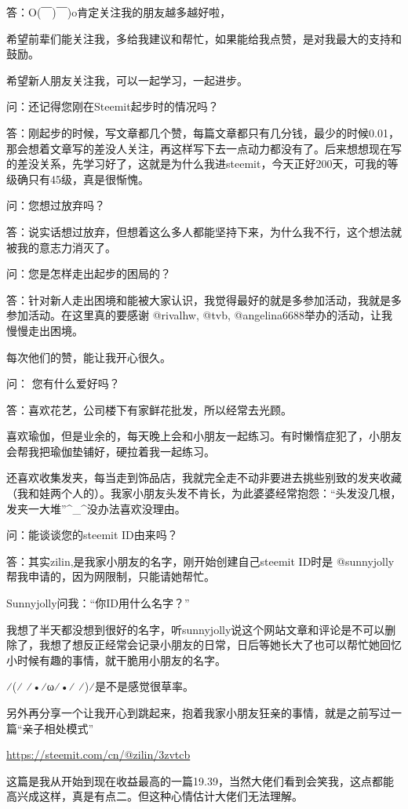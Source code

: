 \documentclass[]{ctexbook}
\begin{document}
答：O(￣)￣)o肯定关注我的朋友越多越好啦，

希望前辈们能关注我，多给我建议和帮忙，如果能给我点赞，是对我最大的支持和鼓励。

希望新人朋友关注我，可以一起学习，一起进步。

问：还记得您刚在Steemit起步时的情况吗？

答：刚起步的时候，写文章都几个赞，每篇文章都只有几分钱，最少的时候0.01，那会想着文章写的差没人关注，再这样写下去一点动力都没有了。后来想想现在写的差没关系，先学习好了，这就是为什么我进steemit，今天正好200天，可我的等级确只有45级，真是很惭愧。

问：您想过放弃吗？

答：说实话想过放弃，但想着这么多人都能坚持下来，为什么我不行，这个想法就被我的意志力消灭了。

问：您是怎样走出起步的困局的？

答：针对新人走出困境和能被大家认识，我觉得最好的就是多参加活动，我就是多参加活动。在这里真的要感谢 @rivalhw, @tvb, @angelina6688举办的活动，让我慢慢走出困境。

每次他们的赞，能让我开心很久。

问： 您有什么爱好吗？

答：喜欢花艺，公司楼下有家鲜花批发，所以经常去光顾。

喜欢瑜伽，但是业余的，每天晚上会和小朋友一起练习。有时懒惰症犯了，小朋友会帮我把瑜伽垫铺好，硬拉着我一起练习。

还喜欢收集发夹，每当走到饰品店，我就完全走不动非要进去挑些别致的发夹收藏（我和娃两个人的）。我家小朋友头发不肯长，为此婆婆经常抱怨：``头发没几根，发夹一大堆''\^{}\_\^{}没办法喜欢没理由。

问：能谈谈您的steemit ID由来吗？

答：其实zilin,是我家小朋友的名字，刚开始创建自己steemit ID时是 @sunnyjolly帮我申请的，因为网限制，只能请她帮忙。

Sunnyjolly问我：``你ID用什么名字？''

我想了半天都没想到很好的名字，听sunnyjolly说这个网站文章和评论是不可以删除了，我想了想反正经常会记录小朋友的日常，日后等她长大了也可以帮忙她回忆小时候有趣的事情，就干脆用小朋友的名字。

⁄(⁄ ⁄•⁄ω⁄•⁄ ⁄)⁄是不是感觉很草率。

另外再分享一个让我开心到跳起来，抱着我家小朋友狂亲的事情，就是之前写过一篇``亲子相处模式''

\url{https://steemit.com/cn/@zilin/3zvtcb}

这篇是我从开始到现在收益最高的一篇19.39，当然大佬们看到会笑我，这点都能高兴成这样，真是有点二。但这种心情估计大佬们无法理解。
\end{document}
